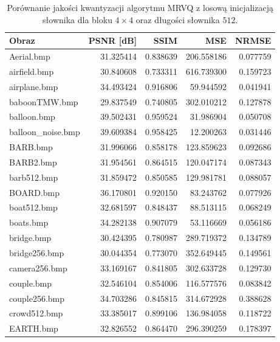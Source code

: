 \documentclass{article}
\begin{document}
\begin{table}[h]
  \caption{Porównanie jakości kwantyzacji algorytmu MRVQ z losową inicjalizacją słownika dla bloku $4 \times 4$ oraz długości słownika $512$.}
  \label{tab:mrvq_random}
  \centering
  \begin{tabular}{@{}lrrrr@{}}

    \toprule
    Obraz              & PSNR [dB] & SSIM     & MSE        & NRMSE    \\
    \midrule
    Aerial.bmp         & 31.325414 & 0.838639 & 206.558186 & 0.077759 \\
    airfield.bmp       & 30.840608 & 0.733311 & 616.739300 & 0.159723 \\
    airplane.bmp       & 34.493424 & 0.916806 & 59.944592  & 0.041941 \\
    baboonTMW.bmp      & 29.837549 & 0.740805 & 302.010212 & 0.127878 \\
    balloon.bmp        & 39.502431 & 0.959524 & 31.986904  & 0.050708 \\
    balloon\_noise.bmp & 39.609384 & 0.958425 & 12.200263  & 0.031446 \\
    BARB.bmp           & 31.996066 & 0.858178 & 123.859623 & 0.092686 \\
    BARB2.bmp          & 31.954561 & 0.864515 & 120.047174 & 0.087343 \\
    barb512.bmp        & 31.859472 & 0.850585 & 129.981781 & 0.088057 \\
    BOARD.bmp          & 36.170801 & 0.920150 & 83.243762  & 0.077926 \\
    boat512.bmp        & 32.681597 & 0.848437 & 88.513115  & 0.068249 \\
    boats.bmp          & 34.282138 & 0.907079 & 53.116669  & 0.056186 \\
    bridge.bmp         & 30.424395 & 0.780987 & 289.719372 & 0.134789 \\
    bridge256.bmp      & 30.044354 & 0.773070 & 352.649445 & 0.149561 \\
    camera256.bmp      & 33.169167 & 0.841805 & 302.633728 & 0.129730 \\
    couple.bmp         & 32.546104 & 0.854006 & 116.577576 & 0.083842 \\
    couple256.bmp      & 34.703286 & 0.845815 & 314.672928 & 0.388628 \\
    crowd512.bmp       & 33.385017 & 0.899106 & 136.984058 & 0.118722 \\
    EARTH.bmp          & 32.826552 & 0.864470 & 296.390259 & 0.178397 \\

\end{tabular}
\end{table}
\end{document}
